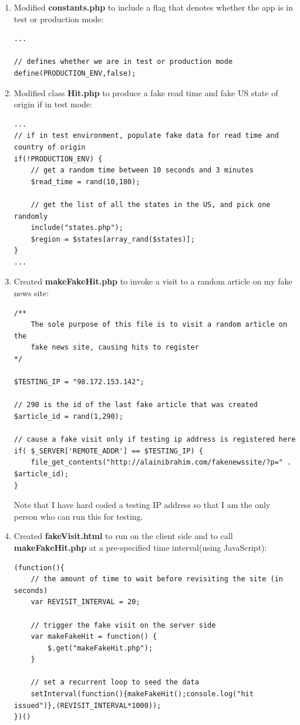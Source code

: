 \documentclass[12pt]{article}
\begin{document}
\begin{enumerate}
\item{Modified \textbf{constants.php} to include a flag that denotes whether the app is in test or production mode:}
\begin{lstlisting}[basicstyle=\scriptsize]
...

// defines whether we are in test or production mode
define(PRODUCTION_ENV,false);
\end{lstlisting}

\item{Modified class \textbf{Hit.php} to produce a fake read time and fake US state of origin if in test mode:}
\begin{lstlisting}[basicstyle=\scriptsize]
...
// if in test environment, populate fake data for read time and country of origin
if(!PRODUCTION_ENV) {
	// get a random time between 10 seconds and 3 minutes
	$read_time = rand(10,180);
	
	// get the list of all the states in the US, and pick one randomly
	include("states.php");
	$region = $states[array_rand($states)];
}
...
\end{lstlisting}
\item{Created \textbf{makeFakeHit.php} to invoke a visit to a random article on my fake news site:}
\begin{lstlisting}[basicstyle=\scriptsize]
/**
	The sole purpose of this file is to visit a random article on the 
	fake news site, causing hits to register
*/

$TESTING_IP = "98.172.153.142";

// 290 is the id of the last fake article that was created
$article_id = rand(1,290);

// cause a fake visit only if testing ip address is registered here
if( $_SERVER['REMOTE_ADDR'] == $TESTING_IP) {
	file_get_contents("http://alainibrahim.com/fakenewssite/?p=" . $article_id);
}
\end{lstlisting}
Note that I have hard coded a testing IP address so that I am the only person who can run this for testing.
\item{Created \textbf{fakeVisit.html} to run on the client side and to call \textbf{makeFakeHit.php} at a pre-specified time interval(using JavaScript):}
\begin{lstlisting}[basicstyle=\scriptsize]
(function(){
	// the amount of time to wait before revisiting the site (in seconds)
	var REVISIT_INTERVAL = 20;

	// trigger the fake visit on the server side
	var makeFakeHit = function() {
		$.get("makeFakeHit.php");
	}
	
	// set a recurrent loop to seed the data
	setInterval(function(){makeFakeHit();console.log("hit issued")},(REVISIT_INTERVAL*1000));
})()
\end{lstlisting}
\end{enumerate}
\end{document}
